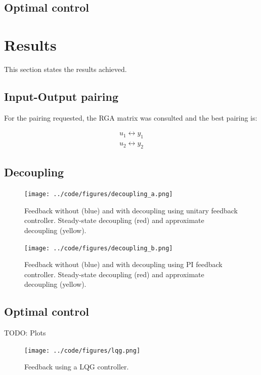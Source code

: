 \documentclass[a4paper, titlepage]{article}
\begin{document}
\subsection{Optimal control}

\section{Results}
This section states the results achieved.

\subsection{Input-Output pairing}
For the pairing requested, the RGA matrix was consulted and the best pairing is:

\begin{equation}
\begin{split}
u_1 \leftrightarrow y_1 \\
u_2 \leftrightarrow y_2
\end{split}
\end{equation}

\subsection{Decoupling}

\begin{figure}[h!]
\center
\texttt{[image: ../code/figures/decoupling\_a.png]}
\caption{Feedback without (blue) and with decoupling using unitary feedback controller. Steady-state decoupling (red) and approximate decoupling (yellow).}
\label{fig:decouplingA}
\end{figure}


\begin{figure}[h!]
\center
\texttt{[image: ../code/figures/decoupling\_b.png]}
\caption{Feedback without (blue) and with decoupling using PI feedback controller. Steady-state decoupling (red) and approximate decoupling (yellow).}
\label{fig:decouplingB}
\end{figure}



\subsection{Optimal control}
TODO: Plots

\begin{figure}[h!]
\center
\texttt{[image: ../code/figures/lqg.png]}
\caption{Feedback using a LQG controller.}
\label{fig:lqgControl}
\end{figure}
\end{document}
